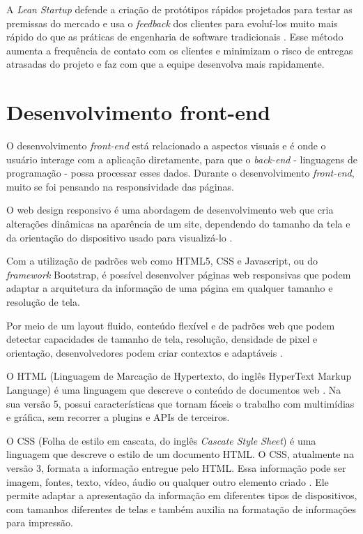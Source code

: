 A \textit{Lean Startup} defende a criação de protótipos rápidos projetados para testar as premissas do mercado e usa o \textit{feedback} dos clientes para evoluí-los muito mais rápido do que as práticas de engenharia de software tradicionais \cite{robbinsd:beck2001agile}. Esse método aumenta a frequência de contato com os clientes e minimizam o risco de entregas atrasadas do projeto e faz com que a equipe desenvolva mais rapidamente.

\section{Desenvolvimento front-end}
O desenvolvimento \textit{front-end} está relacionado a aspectos visuais e é onde o usuário interage com a aplicação diretamente, para que o \textit{back-end} - linguagens de programação - possa processar esses dados. Durante o desenvolvimento \textit{front-end}, muito se foi pensando na responsividade das páginas.

O web design responsivo é uma abordagem de desenvolvimento web que cria alterações dinâmicas na aparência de um site, dependendo do tamanho da tela e da orientação do dispositivo usado para visualizá-lo \cite{ResponsiveWebDesignNNG}.

Com a utilização de padrões web como HTML5, CSS e Javascript, ou do \textit{framework} Bootstrap, é possível desenvolver páginas web responsivas que podem adaptar a arquitetura da informação de uma página em qualquer tamanho e resolução de tela.

Por meio de um layout fluido, conteúdo flexível e de padrões web que podem  detectar capacidades de tamanho de tela, resolução, densidade de pixel e orientação, desenvolvedores podem criar contextos e adaptáveis \cite{Responsive}.

O HTML (Linguagem de Marcação de Hypertexto, do inglês HyperText Markup Language) é uma linguagem que descreve o conteúdo de documentos web \cite{html5}. Na sua versão 5, possui características que tornam fáceis o trabalho com multimídias e gráfica, sem recorrer a plugins e APIs de terceiros.

O CSS (Folha de estilo em cascata, do inglês \textit{Cascate Style Sheet}) é uma linguagem que descreve o estilo de um documento HTML. O CSS, atualmente na versão 3, formata a informação entregue pelo HTML. Essa informação pode ser imagem, fontes, texto, vídeo, áudio ou qualquer outro elemento criado \cite{css3}. Ele permite adaptar a apresentação da informação em diferentes tipos de dispositivos, com tamanhos diferentes de telas e também auxilia na formatação de informações para impressão.

